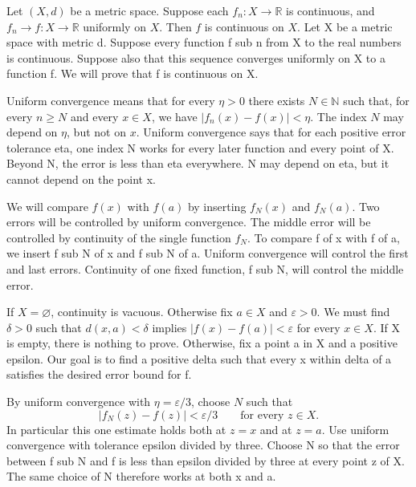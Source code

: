 \documentclass{article}
\begin{document}

{Let $(X,d)$ be a metric space. Suppose each $f_n:X\to\mathbb R$ is continuous, and $f_n\to f:X\to\mathbb R$ uniformly on $X$. Then $f$ is continuous on $X$.}
{Let X be a metric space with metric d. Suppose every function f sub n from X to the real numbers is continuous. Suppose also that this sequence converges uniformly on X to a function f. We will prove that f is continuous on X.}

{Uniform convergence means that for every $\eta>0$ there exists $N\in\mathbb N$ such that, for every $n\ge N$ and every $x\in X$, we have $|f_n(x)-f(x)|<\eta$. The index $N$ may depend on $\eta$, but not on $x$.}
{Uniform convergence says that for each positive error tolerance eta, one index N works for every later function and every point of X. Beyond N, the error is less than eta everywhere. N may depend on eta, but it cannot depend on the point x.}

{We will compare $f(x)$ with $f(a)$ by inserting $f_N(x)$ and $f_N(a)$. Two errors will be controlled by uniform convergence. The middle error will be controlled by continuity of the single function $f_N$.}
{To compare f of x with f of a, we insert f sub N of x and f sub N of a. Uniform convergence will control the first and last errors. Continuity of one fixed function, f sub N, will control the middle error.}

{If $X=\varnothing$, continuity is vacuous. Otherwise fix $a\in X$ and $\varepsilon>0$. We must find $\delta>0$ such that $d(x,a)<\delta$ implies $|f(x)-f(a)|<\varepsilon$ for every $x\in X$.}
{If X is empty, there is nothing to prove. Otherwise, fix a point a in X and a positive epsilon. Our goal is to find a positive delta such that every x within delta of a satisfies the desired error bound for f.}

{By uniform convergence with $\eta=\varepsilon/3$, choose $N$ such that
\[|f_N(z)-f(z)|<\varepsilon/3\qquad\text{for every }z\in X.\]
In particular this one estimate holds both at $z=x$ and at $z=a$.}
{Use uniform convergence with tolerance epsilon divided by three. Choose N so that the error between f sub N and f is less than epsilon divided by three at every point z of X. The same choice of N therefore works at both x and a.}
\end{document}
